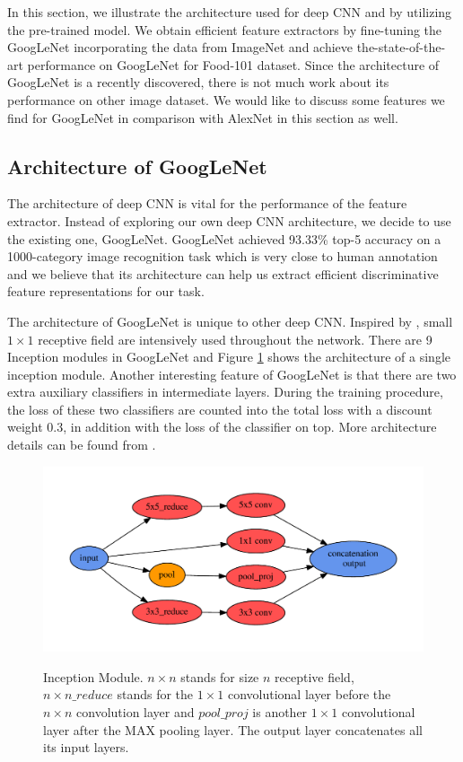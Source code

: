 ﻿In this section, we illustrate the architecture used for deep CNN and by utilizing the pre-trained model. We obtain efficient feature extractors by fine-tuning the GoogLeNet incorporating the data from ImageNet and achieve the-state-of-the-art performance on GoogLeNet for Food-101 dataset. Since the architecture of GoogLeNet is a recently discovered, there is not much work about its performance on other image dataset. We would like to discuss some features we find for GoogLeNet in comparison with AlexNet\cite{krizhevsky2012imagenet} in this section as well.
\subsection{Architecture of GoogLeNet}
The architecture of deep CNN is vital for the performance of the feature extractor.
Instead of exploring our own deep CNN architecture, we decide to use the existing one, GoogLeNet. GoogLeNet achieved 93.33\% top-5 accuracy on a 1000-category image recognition task which is very close to human annotation and we believe that its architecture can help us extract efficient discriminative feature representations for our task.

 The architecture of GoogLeNet is unique to other deep CNN. Inspired by \cite{linNiN}, small $1\times 1$ receptive field are intensively used throughout the network. There are 9 Inception modules in GoogLeNet and Figure \ref{incept} shows the architecture of a single inception module. Another interesting feature of GoogLeNet is that there are two extra auxiliary classifiers in intermediate layers. During the training procedure, the loss of these two classifiers are counted into the total loss with a discount weight 0.3, in addition with the loss of the classifier on top. More architecture details can be found from \cite{szegedy2014going}.

\begin{figure}
  \centering
  \includegraphics[scale=.45]{fig/inception.pdf}\\
  \caption{Inception Module. $n\times n$ stands for size $n$ receptive field, $n\times n\_reduce$ stands for the $1\times 1$ convolutional layer before the $n\times n$ convolution layer and $pool\_proj$ is another $1\times 1$ convolutional layer after the MAX pooling layer. The output layer concatenates all its input layers.}\label{incept}
\end{figure}

